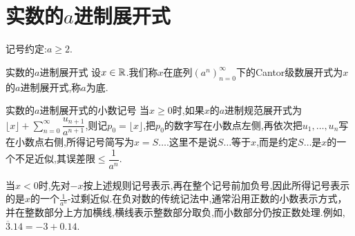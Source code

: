 \section{实数的\texorpdfstring{$a$}{a}进制展开式}

记号约定:$a\geq 2$.

\begin{definition}{实数的$a$进制展开式}{}
	设$x\in\mathbb{R}$.我们称$x$在底列$\left(a^{n}\right)_{n=0}^{\infty}$下的Cantor级数展开式为$x$的$a$进制展开式,称$a$为底.
\end{definition}

\begin{convention}{实数的$a$进制展开式的小数记号}{}
	当$x\geq 0$时,如果$x$的$a$进制规范展开式为$\lfloor x\rfloor+\sum\limits_{n=0}^{\infty}\dfrac{u_{n+1}}{a^{n+1}}$,则记$p_{0}=\lfloor x\rfloor$,把$p_{0}$的数字写在小数点左侧,再依次把$u_{1},\ldots,u_{n}$写在小数点右侧,所得记号简写为$x=S\ldots$.这里不是说$S\ldots$等于$x$,而是约定$S\ldots$是$x$的一个不足近似,其误差限$\leq\dfrac{1}{a^{n}}$.
	
	当$x<0$时,先对$-x$按上述规则记号表示,再在整个记号前加负号,因此所得记号表示的是$x$的一个$\frac{1}{a^{n}}$-过剩近似.在负对数的传统记法中,通常沿用正数的小数表示方式，并在整数部分上方加横线,横线表示整数部分取负,而小数部分仍按正数处理.例如,$\overline{3}.14=-3+0.14$.
\end{convention}


